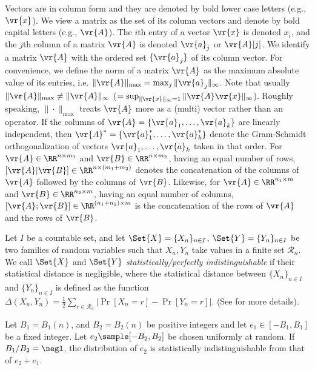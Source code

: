 \documentclass{fundam}
\begin{document}
Vectors are in column form and they are denoted by bold lower case letters (e.g., $\vr{x}$). We view a matrix as the set of its column vectors and denote by bold capital letters (e.g., $\vr{A}$). The $i$th entry of a vector $\vr{x}$ is denoted $x_{i}$, and the $j$th column of a matrix $\vr{A}$ is denoted $\vr{a}_{j}$ or $\vr{A}[j]$. We identify a matrix $\vr{A}$ with the ordered set $\{\vr{a}_{j}\}$ of its column vector. For convenience, we define the norm of a matrix $\vr{A}$ as the maximum absolute value of its entries, i.e. $\|\vr{A}\|_{\max} = \max_{j}\|\vr{a}_{j}\|_{\infty}$. Note that usually $\|\vr{A}\|_{\max} \neq \|\vr{A} \|_{\infty} $ ($=\sup_{\|\vr{x}\|_{\infty}=1}\|\vr{A}\vr{x}\|_{\infty}$). Roughly speaking, $\|\cdot \|_{\max}$ treats $\vr{A}$ more as a (multi) vector rather than an operator. If the columns of $\vr{A} = \{ \vr{a}_{1}, \ldots ,  \vr{a}_{k} \}$ are linearly independent, then $\vr{A}^{*} = \{ \vr{a}_{1}^{*}, \ldots ,  \vr{a}_{k}^{*} \} $ denote the Gram-Schmidt orthogonalization of vectors $\vr{a}_{1}, \ldots ,  \vr{a}_{k}$ taken in that order. For $\vr{A}\in\RR^{n\times m_{1}}$ and $\vr{B}\in\RR^{n\times m_{2}}$, having an equal number of rows, $[\vr{A}|\vr{B}]\in\RR^{n\times (m_{1}+m_{2})}$ denotes the concatenation of the columns of $\vr{A}$ followed by the columns of $\vr{B}$. Likewise, for  $\vr{A}\in\RR^{n_{1}\times m}$ and $\vr{B}\in\RR^{n_{2}\times m}$, having an equal number of columns, $[\vr{A};\vr{B}]\in\RR^{(n_{1}+n_{2})\times m}$ is the concatenation of the rows of $\vr{A}$ and the rows of $\vr{B}$.

Let $I$ be a countable set, and let $\Set{X}=\{X_{n}\}_{n\in I}$, $\Set{Y}=\{Y_{n}\}_{n\in I}$ be two families of random variables such that $X_{n}, Y_{n}$ take values in a finite set $\mathcal{R}_{n}$. We call $\Set{X}$ and $\Set{Y}$ \textit{statistically/perfectly indistinguishable} if  their statistical distance is negligible, where the statistical distance between $\{X_{n}\}_{n\in I}$ and $\{Y_{n}\}_{n\in I}$ is defined as the function
	$\Delta(X_{n}, Y_{n}) = \frac{1}{2}\sum_{r\in \mathcal{R}_{n}} \left| \Pr[X_{n}=r] - \Pr[Y_{n}=r]  \right|.$
(See \cite{goldreich2001foundations} for more details).

\begin{lemma}\label{lem::smudging}
	Let $B_{1}=B_{1}(n)$, and $B_{2}=B_{2}(n)$ be positive integers and let $e_{1}\in [-B_{1}, B_{1}]$ be a fixed integer. Let $e_{2}\sample [-B_{2}, B_{2}]$ be chosen uniformly at random. If $B_{1}/B_{2}=\negl$, the distribution of $e_{2}$ is statistically indistinguishable from that of $e_{2}+e_{1}$.
\end{lemma}	
\end{document}

